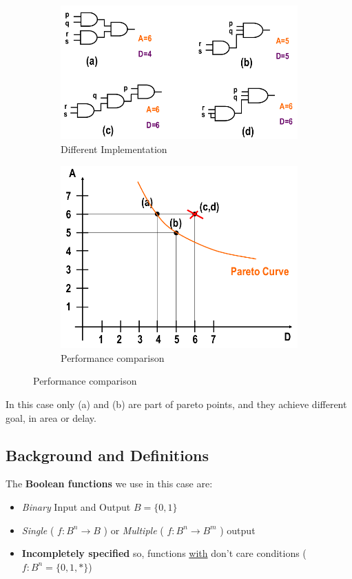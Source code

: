 \begin{figure}[H]
	\centering
	\begin{subfigure}[b]{0.5\textwidth}
		\includegraphics[width=\textwidth]{./Cap6/Images/Image1.png}
		\caption{Different Implementation}
		\label{fig:possImpl}
	\end{subfigure}
	\quad\quad
	\begin{subfigure}[b]{0.4\textwidth}
		\includegraphics[width=\textwidth]{./Cap6/Images/Image2.png}
		\caption{Performance comparison}
		\label{fig:perform}
	\end{subfigure}
\end{figure}
In this case only (a) and (b) are part of pareto points, and they achieve different goal, in area or delay.
\bigskip\\
\subsection{Background and Definitions}
The \textbf{Boolean functions} we use in this case are:
\begin{itemize}
	\item \textit{Binary} Input and Output $ B = \{0, 1\} $ 
	\item \textit{Single} ( $ f : B^{n} \rightarrow B $ ) or\textit{ Multiple} (  $ f : B^{n} \rightarrow B^{m} $ ) output
	\item \textbf{Incompletely specified} so, functions \underline{with} don't care conditions ($ f: B^{n} = \{0, 1, *\} $)
\end{itemize}
